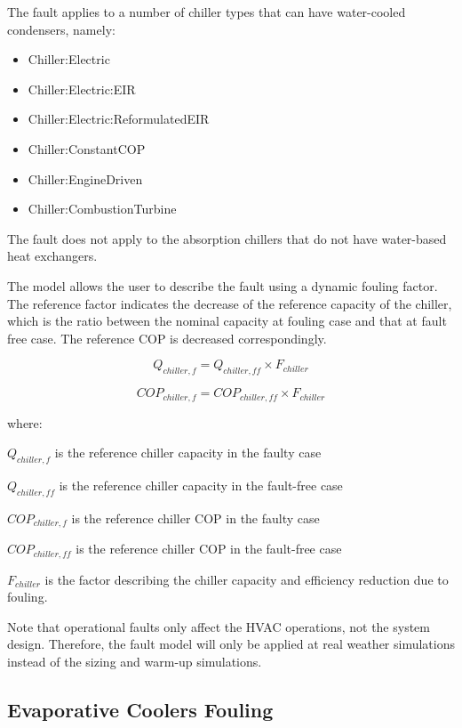 The fault applies to a number of chiller types that can have water-cooled condensers, namely:

\begin{itemize}
\tightlist
\item
  Chiller:Electric
\item
  Chiller:Electric:EIR
\item
  Chiller:Electric:ReformulatedEIR
\item
  Chiller:ConstantCOP
\item
  Chiller:EngineDriven
\item
  Chiller:CombustionTurbine
\end{itemize}

The fault does not apply to the absorption chillers that do not have water-based heat exchangers.

The model allows the user to describe the fault using a dynamic fouling factor. The reference factor indicates the decrease of the reference capacity of the chiller, which is the ratio between the nominal capacity at fouling case and that at fault free case. The reference COP is decreased correspondingly.

\begin{equation}
Q_{chiller,f} = Q_{chiller,ff} \times F_{chiller}
\end{equation}

\begin{equation}
COP_{chiller,f} = COP_{chiller,ff} \times F_{chiller}
\end{equation}

where:

\(Q_{chiller,f}\) is the reference chiller capacity in the faulty case

\(Q_{chiller,ff}\) is the reference chiller capacity in the fault-free case

\(COP_{chiller,f}\) is the reference chiller COP in the faulty case

\(COP_{chiller,ff}\) is the reference chiller COP in the fault-free case

\(F_{chiller}\) is the factor describing the chiller capacity and efficiency reduction due to fouling.

Note that operational faults only affect the HVAC operations, not the system design. Therefore, the fault model will only be applied at real weather simulations instead of the sizing and warm-up simulations.


\subsection{Evaporative Coolers Fouling}\label{evaporative-cooler-fouling}

